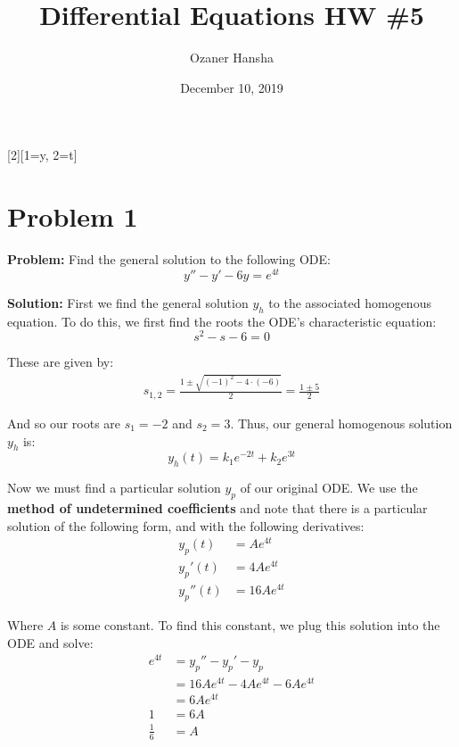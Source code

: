 \documentclass{article}
\begin{document}
\title{Differential Equations HW \#5}
\author{Ozaner Hansha}
\date{December 10, 2019}
\maketitle

[2][1=y, 2=t]{}
\newcommand*\eval[3]{\left[#1\right]_{#2}^{#3}}
\renewcommand{\vec}[1]{\mathbf{#1}}
\newcommand*\tr[1]{\text{tr}\left(#1\right)}
\renewcommand*{\Re}[1]{\operatorname {Re}\left(#1\right)}
\renewcommand*{\Im}[1]{\operatorname {Im}\left(#1\right)}

\section*{Problem 1}
\noindent\textbf{Problem:} Find the general solution to the following ODE:
\begin{equation*}
  y''-y'-6y=e^{4t}
\end{equation*}

\noindent\textbf{Solution:} First we find the general solution $y_h$ to the associated homogenous equation. To do this, we first find the roots the ODE's characteristic equation:
\begin{equation*}
  s^2-s-6=0
\end{equation*}

These are given by:
\begin{align*}
  s_{1,2}=\frac{1\pm\sqrt{(-1)^2-4\cdot(-6)}}{2}=\frac{1\pm 5}{2}
\end{align*}

And so our roots are $s_1=-2$ and $s_2=3$. Thus, our general homogenous solution $y_h$ is:
\begin{equation*}
  y_h(t)=k_1e^{-2t}+k_2e^{3t}
\end{equation*}

Now we must find a particular solution $y_p$ of our original ODE. We use the \textbf{method of undetermined coefficients} and note that there is a particular solution of the following form, and with the following derivatives:
\begin{align*}
  y_p(t)&=Ae^{4t}\\
  y_p'(t)&=4Ae^{4t}\\
  y_p''(t)&=16Ae^{4t}
\end{align*}

Where $A$ is some constant. To find this constant, we plug this solution into the ODE and solve:
\begin{align*}
  e^{4t}&=y_p''-y_p'-y_p\\
  &=16Ae^{4t}-4Ae^{4t}-6Ae^{4t}\\
  &=6Ae^{4t}\\
  1&=6A\\
  \frac{1}{6}&=A
\end{align*}
\end{document}
